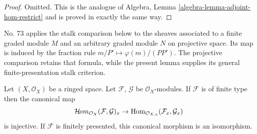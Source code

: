 \begin{proof}
Omitted. This is the analogue of
Algebra, Lemma \ref{algebra-lemma-adjoint-hom-restrict}
and is proved in exactly the same way.
\end{proof}

\begin{lemma}
\label{lemma-stalk-internal-hom}
\begin{reference}
\cite[Chapter I, \S 1, no. 11, pp. 206--207]{FAC}
\cite[Chapter III, \S 5, no. 73, Proposition 1(a) and proof,
pp. 267--268]{FAC}
\end{reference}
\begin{history}
No. 73 applies the stalk comparison below to the sheaves associated to a
finite graded module $M$ and an arbitrary graded module $N$ on projective
space. Its map is induced by the fraction rule
$m/P'\mapsto\varphi(m)/(PP')$. The projective comparison retains that
formula, while the present lemma supplies its general finite-presentation
stalk criterion.
\end{history}
Let $(X, \mathcal{O}_X)$ be a ringed space.
Let $\mathcal{F}$, $\mathcal{G}$ be $\mathcal{O}_X$-modules.
If $\mathcal{F}$ is of finite type then the canonical map
$$
\mathop{\mathcal{H}\!\mathit{om}}\nolimits_{\mathcal{O}_X}(\mathcal{F}, \mathcal{G})_x
\to
\mathop{\mathrm{Hom}}\nolimits_{\mathcal{O}_{X, x}}(\mathcal{F}_x, \mathcal{G}_x)
$$
is injective.
If $\mathcal{F}$ is finitely presented,
this canonical morphism is an isomorphism.
\end{lemma}

